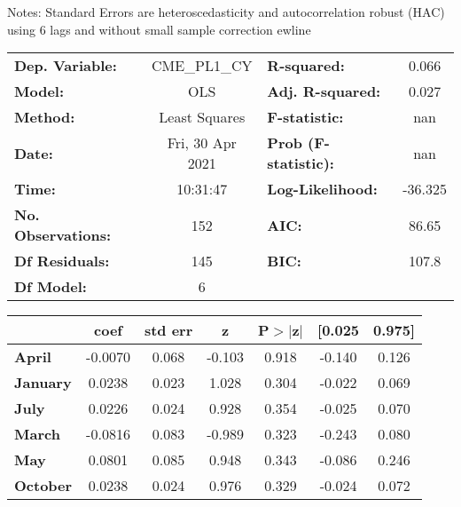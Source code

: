 Notes: \newline
 [1] Standard Errors are heteroscedasticity and autocorrelation robust (HAC) using 6 lags and without small sample correction
ewline\begin{center}
\begin{tabular}{lclc}
\toprule
\textbf{Dep. Variable:}    &   CME\_PL1\_CY   & \textbf{  R-squared:         } &     0.066   \\
\textbf{Model:}            &       OLS        & \textbf{  Adj. R-squared:    } &     0.027   \\
\textbf{Method:}           &  Least Squares   & \textbf{  F-statistic:       } &       nan   \\
\textbf{Date:}             & Fri, 30 Apr 2021 & \textbf{  Prob (F-statistic):} &      nan    \\
\textbf{Time:}             &     10:31:47     & \textbf{  Log-Likelihood:    } &   -36.325   \\
\textbf{No. Observations:} &         152      & \textbf{  AIC:               } &     86.65   \\
\textbf{Df Residuals:}     &         145      & \textbf{  BIC:               } &     107.8   \\
\textbf{Df Model:}         &           6      & \textbf{                     } &             \\
\bottomrule
\end{tabular}
\begin{tabular}{lcccccc}
                 & \textbf{coef} & \textbf{std err} & \textbf{z} & \textbf{P$> |$z$|$} & \textbf{[0.025} & \textbf{0.975]}  \\
\midrule
\textbf{April}   &      -0.0070  &        0.068     &    -0.103  &         0.918        &       -0.140    &        0.126     \\
\textbf{January} &       0.0238  &        0.023     &     1.028  &         0.304        &       -0.022    &        0.069     \\
\textbf{July}    &       0.0226  &        0.024     &     0.928  &         0.354        &       -0.025    &        0.070     \\
\textbf{March}   &      -0.0816  &        0.083     &    -0.989  &         0.323        &       -0.243    &        0.080     \\
\textbf{May}     &       0.0801  &        0.085     &     0.948  &         0.343        &       -0.086    &        0.246     \\
\textbf{October} &       0.0238  &        0.024     &     0.976  &         0.329        &       -0.024    &        0.072     \\

\end{tabular}
\end{center}
